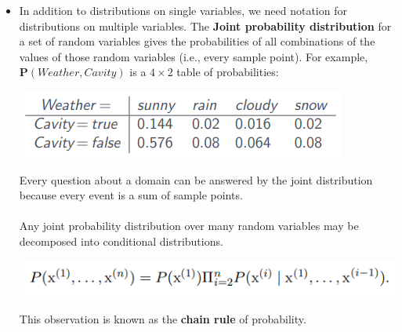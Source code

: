 \begin{itemize}
     \item In addition to distributions on single variables, we need notation for distributions on multiple variables. The \textbf{Joint probability distribution} for a set of random variables gives the probabilities of all combinations of the values of those random variables (i.e., every sample point). For example, $\textbf{P}(Weather, Cavity)$ is a $4 \times 2$ table of probabilities:
     \begin{center}
         \includegraphics[]{images/joint-prob.png}
     \end{center}
     Every question about a domain can be answered by the joint distribution because every event is a sum of sample points.\\\\
     Any joint probability distribution over many random variables may be decomposed into conditional distributions.
     \begin{center}
         \includegraphics[]{images/chain-rule.png}
     \end{center}
     This observation is known as the \textbf{chain rule} of probability.
\end{itemize}

